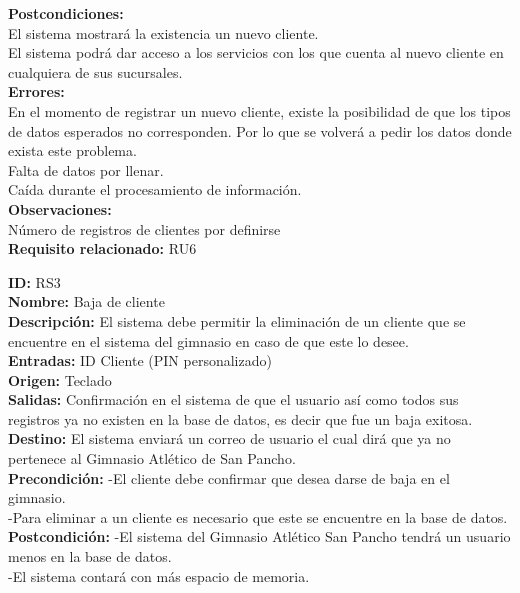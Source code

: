 \textbf{Postcondiciones:}\\
El sistema mostrará la existencia un nuevo cliente. \\
El sistema podrá dar acceso a los servicios con los que cuenta al nuevo cliente en cualquiera de sus sucursales.\\

\textbf{Errores:}\\

En el momento de registrar un nuevo cliente, existe la posibilidad de que los tipos de datos esperados  no corresponden. Por lo que se volverá a pedir los datos donde exista este problema.\\
Falta de datos por llenar.\\
Caída durante el procesamiento de información.\\

\textbf{Observaciones:}\\
      Número de registros de clientes por definirse \\
\textbf{Requisito relacionado: }RU6		\\
\vspace*{0.2in}

\textbf{ID:} RS3\\
\textbf{Nombre:} Baja de cliente\\
\textbf{Descripción:} El sistema debe permitir la eliminación de un cliente que se encuentre en el sistema del gimnasio en caso de que este lo desee.\\

\textbf{Entradas: }
ID Cliente (PIN personalizado)\\
\textbf{Origen:} Teclado\\
\textbf{Salidas:} Confirmación en el sistema de que el usuario así como todos sus registros ya no existen en la base de datos, es decir que fue un baja exitosa.\\
\textbf{Destino:} El sistema enviará un correo de usuario el cual dirá que ya no pertenece al Gimnasio Atlético de San Pancho.\\
\textbf{Precondición: }
-El cliente debe confirmar que desea darse de baja en el gimnasio.\\
-Para eliminar a un cliente es necesario que este se encuentre en la base de datos. \\
\textbf{Postcondición: }
-El sistema del Gimnasio Atlético San Pancho tendrá un usuario menos en la base de datos.\\
-El sistema contará con más espacio de memoria.\\

